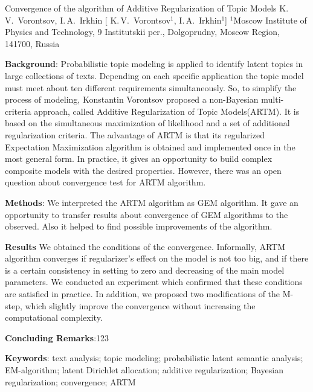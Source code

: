 \documentclass[12pt, twoside]{article}
\begin{document}
\titleEng
{Convergence of the algorithm of Additive Regularization of Topic Models}
\authorEng
	{K.\,V.~Vorontsov, I.\,A.~Irkhin} %
   [ K.\,V.~Vorontsov$^{1}$, I.\,A.~Irkhin$^{1}$] %
\organizationEng
    {$^1$Moscow Institute of Physics and Technology, 9 Institutskii per., Dolgoprudny, Moscow Region, 141700, Russia}
\abstractEng
    {
	\noindent
	\textbf{Background}: Probabilistic topic modeling is applied to identify latent topics in large collections of texts. Depending on each specific application the topic model must meet about ten different requirements simultaneously. So, to simplify the process of modeling, Konstantin Vorontsov proposed a non-Bayesian multi-criteria approach, called Additive Regularization of Topic Models(ARTM). It is based on the simultaneous maximization  of likelihood and a set of additional regularization criteria. The advantage of ARTM  is that its regularized Expectation Maximization algorithm is obtained and implemented once in the most general form. In practice, it gives an opportunity to build complex composite models with the desired properties. However, there was an open question about convergence test for ARTM algorithm.
	
	\noindent
	\textbf{Methods}: We interpreted the ARTM algorithm as GEM algorithm. It gave an opportunity to transfer results about convergence of GEM algorithms to the observed. Also it helped to find possible improvements of the algorithm.
	
	\noindent
	\textbf{Results} We obtained the conditions of the convergence. Informally, ARTM algorithm converges if regularizer's effect on the model is not too big, and if there is a certain consistency in setting to zero and decreasing  of the main model parameters.  We conducted an experiment which confirmed that these conditions are satisfied in practice. In addition, we proposed two modifications of the M-step, which slightly improve the convergence without increasing the computational complexity.
	
	\noindent
	\textbf{Concluding Remarks}:123
		
	\noindent
    	\textbf{Keywords}:  { text analysis; topic modeling; probabilistic latent semantic analysis; EM-algorithm; latent Dirichlet
allocation; additive regularization; Bayesian regularization; convergence; ARTM}
}
\end{document}
